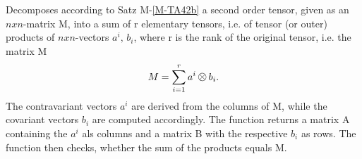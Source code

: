 \documentclass[../Maxima_Workbook.tex]{subfiles}
\begin{document}
\lz {} \hfill {}

\lz Decomposes according to Satz M-\ref{M-TA42b} a second order tensor, given as an $ n x n $-matrix M, into a sum of r elementary tensors, i.e. of tensor (or outer) products of $ n x n $-vectors $ a^i, \, b_i $, where r is the rank of the original tensor, i.e. the matrix M
\begin{equation*}
	M = \sum_{i=1}^{r} a^i \gotimes b_i.
\end{equation*}
The contravariant vectors $ a^i $ are derived from the columns of M, while the covariant vectors $ b_i $ are computed accordingly. The function returns a matrix A containing the $ a^i $ als columns and a matrix B with the respective $ b_i $ as rows. The function then checks, whether the sum of the products equals M.
\end{document}
